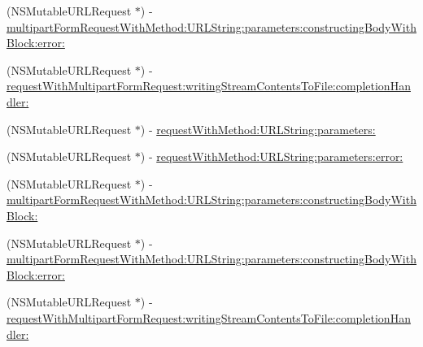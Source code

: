 \begin{Indent}
\begin{DoxyCompactItemize}
\item 
(N\+S\+Mutable\+U\+R\+L\+Request $\ast$) -\/ \mbox{\hyperlink{interface_a_f_h_t_t_p_request_serializer_a814033bcf329a601894a8b70991386d3}{multipart\+Form\+Request\+With\+Method\+:\+U\+R\+L\+String\+:parameters\+:constructing\+Body\+With\+Block\+:error\+:}}
\item 
(N\+S\+Mutable\+U\+R\+L\+Request $\ast$) -\/ \mbox{\hyperlink{interface_a_f_h_t_t_p_request_serializer_af7a636b437782ad5a93351fcefa5ce46}{request\+With\+Multipart\+Form\+Request\+:writing\+Stream\+Contents\+To\+File\+:completion\+Handler\+:}}
\item 
(N\+S\+Mutable\+U\+R\+L\+Request $\ast$) -\/ \mbox{\hyperlink{interface_a_f_h_t_t_p_request_serializer_a929788bfc0a6bfda0a686a019dae1803}{request\+With\+Method\+:\+U\+R\+L\+String\+:parameters\+:}}
\item 
(N\+S\+Mutable\+U\+R\+L\+Request $\ast$) -\/ \mbox{\hyperlink{interface_a_f_h_t_t_p_request_serializer_ac348d84d91a02fe1461b6ecf00129ef5}{request\+With\+Method\+:\+U\+R\+L\+String\+:parameters\+:error\+:}}
\item 
(N\+S\+Mutable\+U\+R\+L\+Request $\ast$) -\/ \mbox{\hyperlink{interface_a_f_h_t_t_p_request_serializer_a7fc28e3419037c411489c3aa16c754a0}{multipart\+Form\+Request\+With\+Method\+:\+U\+R\+L\+String\+:parameters\+:constructing\+Body\+With\+Block\+:}}
\item 
(N\+S\+Mutable\+U\+R\+L\+Request $\ast$) -\/ \mbox{\hyperlink{interface_a_f_h_t_t_p_request_serializer_a814033bcf329a601894a8b70991386d3}{multipart\+Form\+Request\+With\+Method\+:\+U\+R\+L\+String\+:parameters\+:constructing\+Body\+With\+Block\+:error\+:}}
\item 
(N\+S\+Mutable\+U\+R\+L\+Request $\ast$) -\/ \mbox{\hyperlink{interface_a_f_h_t_t_p_request_serializer_af7a636b437782ad5a93351fcefa5ce46}{request\+With\+Multipart\+Form\+Request\+:writing\+Stream\+Contents\+To\+File\+:completion\+Handler\+:}}
\end{DoxyCompactItemize}
\end{Indent}
